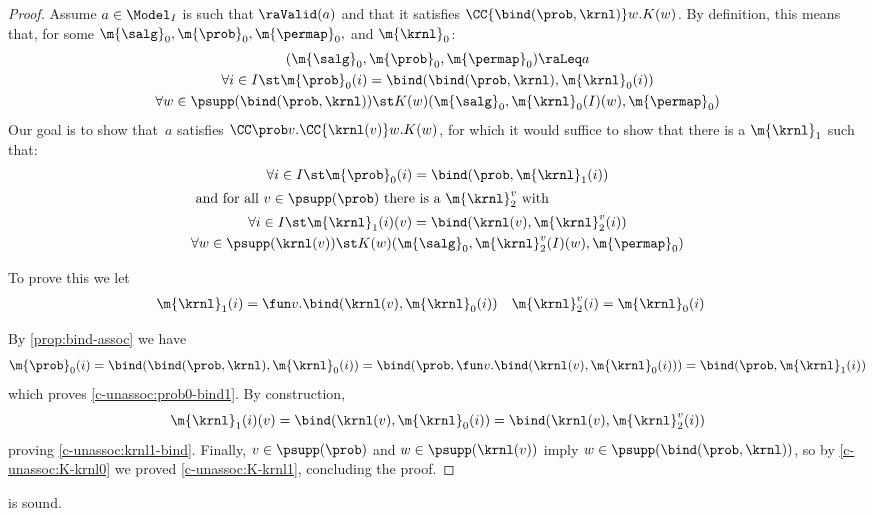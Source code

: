 \documentclass[acmsmall,nonacm,screen,appendix]{acmart}
\begin{document}
\begin{proof}
  Assume $a \in \Model_I$ is such that
  $\raValid(a)$ and that it satisfies
  $ \CC{\bind(\prob,\krnl)} w.K(w) $.
  By definition, this means that,
  for some $ \m{\salg}_0, \m{\prob}_0,\m{\permap}_0,$ and $ \m{\krnl}_0 $:
  \begin{gather}
    (\m{\salg}_0, \m{\prob}_0,\m{\permap}_0) \raLeq a
    \label{c-unassoc:prob0}
    \\
    \forall i\in I\st
      \m{\prob}_0(i) = \bind(\bind(\prob, \krnl), \m{\krnl}_0(i))
    \label{c-unassoc:prob0-bind}
    \\
    \forall w \in \psupp(\bind(\prob, \krnl)) \st
      K(w)(\m{\salg}_0, \m{\krnl}_0(I)(w), \m{\permap}_0)
    \label{c-unassoc:K-krnl0}
  \end{gather}
  Our goal is to show that~$a$ satisfies
  $\CC\prob v. \CC{\krnl(v)} w.K(w)$,
  for which it would suffice to show that there is a $\m{\krnl}_1$
  such that:
  \begin{gather}
    \forall i\in I\st
      \m{\prob}_0(i) = \bind(\prob, \m{\krnl}_1(i))
    \label{c-unassoc:prob0-bind1}
    \\
    \intertext{
      and for all $v \in \psupp(\prob)$
      there is a $\m{\krnl}_2^v$ with
    }
    \forall i\in I\st
      \m{\krnl}_1(i)(v) = \bind(\krnl(v), \m{\krnl}_2^v(i))
    \label{c-unassoc:krnl1-bind}
    \\
    \forall w \in \psupp(\krnl(v)) \st
      K(w)(\m{\salg}_0, \m{\krnl}_2^v(I)(w), \m{\permap}_0)
    \label{c-unassoc:K-krnl1}
  \end{gather}

  To prove this we let
  \begin{align*}
    \m{\krnl}_1(i) &= \fun v.\bind(\krnl(v), \m{\krnl}_0(i))
    &
    \m{\krnl}_2^v(i) &= \m{\krnl}_0(i)
  \end{align*}

  By \eqref{prop:bind-assoc} we have
  \[
    \m{\prob}_0(i)
    = \bind(\bind(\prob, \krnl), \m{\krnl}_0(i))
    = \bind(\prob, \fun v.\bind(\krnl(v), \m{\krnl}_0(i)))
    = \bind(\prob, \m{\krnl}_1(i))
  \]
  which proves \eqref{c-unassoc:prob0-bind1}.
  By construction,
  \[
    \m{\krnl}_1(i)(v)
    = \bind(\krnl(v), \m{\krnl}_0(i))
    = \bind(\krnl(v), \m{\krnl}_2^v(i))
  \]
  proving \eqref{c-unassoc:krnl1-bind}.
  Finally,
  $v \in \psupp(\prob)$ and $w \in \psupp(\krnl(v))$
  imply $w \in \psupp(\bind(\prob, \krnl))$,
  so by \eqref{c-unassoc:K-krnl0} we proved
  \eqref{c-unassoc:K-krnl1}, concluding the proof.
\end{proof}
 \begin{lemma}
\label{proof:c-and}
   is sound.
\end{lemma}
\end{document}
